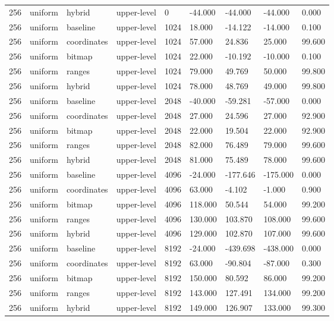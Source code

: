 \begin{tabular}{lllllllll}
256 & uniform & hybrid & upper-level & 0 & -44.000 & -44.000 & -44.000 & 0.000 \\
256 & uniform & baseline & upper-level & 1024 & 18.000 & -14.122 & -14.000 & 0.100 \\
256 & uniform & coordinates & upper-level & 1024 & 57.000 & 24.836 & 25.000 & 99.600 \\
256 & uniform & bitmap & upper-level & 1024 & 22.000 & -10.192 & -10.000 & 0.100 \\
256 & uniform & ranges & upper-level & 1024 & 79.000 & 49.769 & 50.000 & 99.800 \\
256 & uniform & hybrid & upper-level & 1024 & 78.000 & 48.769 & 49.000 & 99.800 \\
256 & uniform & baseline & upper-level & 2048 & -40.000 & -59.281 & -57.000 & 0.000 \\
256 & uniform & coordinates & upper-level & 2048 & 27.000 & 24.596 & 27.000 & 92.900 \\
256 & uniform & bitmap & upper-level & 2048 & 22.000 & 19.504 & 22.000 & 92.900 \\
256 & uniform & ranges & upper-level & 2048 & 82.000 & 76.489 & 79.000 & 99.600 \\
256 & uniform & hybrid & upper-level & 2048 & 81.000 & 75.489 & 78.000 & 99.600 \\
256 & uniform & baseline & upper-level & 4096 & -24.000 & -177.646 & -175.000 & 0.000 \\
256 & uniform & coordinates & upper-level & 4096 & 63.000 & -4.102 & -1.000 & 0.900 \\
256 & uniform & bitmap & upper-level & 4096 & 118.000 & 50.544 & 54.000 & 99.200 \\
256 & uniform & ranges & upper-level & 4096 & 130.000 & 103.870 & 108.000 & 99.600 \\
256 & uniform & hybrid & upper-level & 4096 & 129.000 & 102.870 & 107.000 & 99.600 \\
256 & uniform & baseline & upper-level & 8192 & -24.000 & -439.698 & -438.000 & 0.000 \\
256 & uniform & coordinates & upper-level & 8192 & 63.000 & -90.804 & -87.000 & 0.300 \\
256 & uniform & bitmap & upper-level & 8192 & 150.000 & 80.592 & 86.000 & 99.200 \\
256 & uniform & ranges & upper-level & 8192 & 143.000 & 127.491 & 134.000 & 99.200 \\
256 & uniform & hybrid & upper-level & 8192 & 149.000 & 126.907 & 133.000 & 99.300 \\

\end{tabular}
